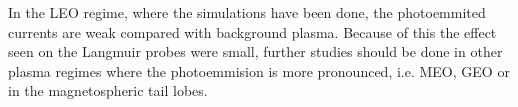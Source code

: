
In the LEO regime, where the simulations have been done, the photoemmited currents are weak compared with
background plasma. Because of this the effect seen on the Langmuir probes were small, further studies should be done
in other plasma regimes where the photoemmision is more pronounced, i.e. MEO, GEO or in the magnetospheric tail lobes.
